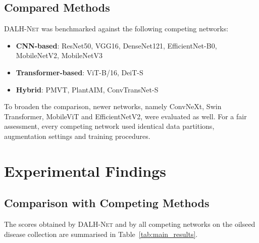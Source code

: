 \documentclass[default, iicol]{sn-jnl}
\theoremstyle{thmstyleone}%
\theoremstyle{thmstyletwo}%
\theoremstyle{thmstylethree}%
\newcommand{\dalh}{\textsc{DALH-Net}}
\begin{document}
\subsection{Compared Methods}

\dalh{} was benchmarked against the following competing networks:

\begin{itemize}
\item \textbf{CNN-based}: ResNet50, VGG16, DenseNet121, EfficientNet-B0, MobileNetV2, MobileNetV3
\item \textbf{Transformer-based}: ViT-B/16, DeiT-S
\item \textbf{Hybrid}: PMVT, PlantAIM, ConvTransNet-S
\end{itemize}
To broaden the comparison, newer networks, namely ConvNeXt, Swin Transformer, MobileViT and EfficientNetV2, were evaluated as well.
For a fair assessment, every competing network used identical data partitions, augmentation settings and training procedures.

\section{Experimental Findings}\label{sec:results}

\subsection{Comparison with Competing Methods}

The scores obtained by \dalh{} and by all competing networks on the oilseed disease collection are summarised in Table~\ref{tab:main_results}.
\end{document}

